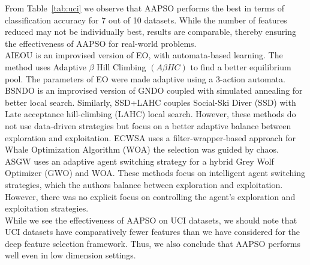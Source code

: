 \documentclass[final,3p,times]{elsarticle}
\begin{document}
{From Table~\ref{tab:uci} we observe that AAPSO performs the best in terms of classification accuracy for 7 out of 10 datasets. While the number of features reduced may not be individually best, results are comparable, thereby ensuring the effectiveness of AAPSO for real-world problems.\\
AIEOU is an improvised version of EO, with {automata-based learning}. The method uses Adaptive $\beta$ Hill Climbing $(A\beta HC)$ to find a better {equilibrium} pool. The parameters of EO {were} made adaptive using a 3-action automata. BSNDO is an improvised version of GNDO coupled with simulated annealing for better local search. {Similarly,} SSD+LAHC couples Social-Ski Diver (SSD) with Late acceptance hill-climbing (LAHC) local search. {However,} these methods do not use {data-driven strategies} but focus on a better adaptive balance between exploration and exploitation. ECWSA uses a filter-wrapper-based approach for Whale Optimization Algorithm (WOA) the selection was guided by chaos. ASGW uses an adaptive agent switching strategy for a hybrid Grey Wolf Optimizer (GWO) and WOA. {These} methods focus on intelligent agent switching strategies, which the authors balance between exploration and exploitation. However, there was no explicit focus on controlling the agent's exploration and exploitation strategies.\\
While we see the effectiveness of AAPSO on UCI datasets, {we} should {note} that UCI datasets have comparatively fewer features than we have considered for the deep feature selection framework. Thus, we also conclude that AAPSO performs well even in low dimension settings.}
\end{document}

